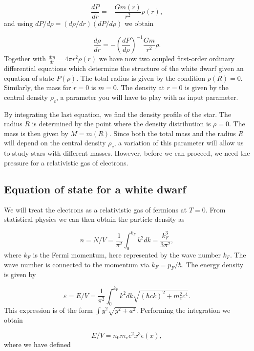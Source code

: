 \documentclass[%
oneside,                 %
final,                   %
10pt]{article}
\begin{document}
\begin{equation*}
\frac{dP}{dr}=-\frac{Gm(r)}{r^{2}}\rho (r),
\end{equation*}
and using $dP/d\rho = (d\rho/dr)(dP/d\rho)$ we obtain

\begin{equation*}
\frac{d\rho}{dr}=-\left(\frac{dP}{d\rho}\right)^{-1}\frac{Gm}{r^{2}}\rho.
\end{equation*}
Together with $\frac{dm}{dr}=4\pi r^{2}\rho (r)$
we have now two coupled first-order ordinary differential equations
which determine the structure of the white dwarf given an equation of state
$P(\rho )$.
The total radius is given by the condition 
$\rho (R)=0$. 
Similarly, the mass for $r=0$
is $m=0$.  
The density at $r=0$ is given by the central density $\rho_{c}$, a parameter you will have to play with 
as input parameter.

By integrating the last equation, we find the density profile of the star.
The radius $R$ is determined by the point where 
the density distribution
is $\rho =0$. 
The mass is then given by $M=m(R)$.
Since both the total mass and the radius $R$ will depend on the central density
$\rho_{c}$, a variation of this parameter will allow us to study stars 
with different masses.
However, before we can proceed, we need the pressure for a relativistic gas of electrons.

\subsection{Equation of state for a white dwarf}

We will treat the electrons as a relativistic gas of fermions at $T=0$.
From statistical physics we can then obtain the particle density as

\begin{equation*}
n=N/V=\frac{1}{\pi^{2}}\int_{0}^{k_{F}}k^{2}dk=\frac{k_{F}^{3}}{3\pi^{2}},
\end{equation*}
where $k_F$ is the Fermi momentum, here represented by the wave number $k_F$.
The wave number is connected to the momentum via $k_F=p_F/\hbar$.
The energy density is given by

\begin{equation*}
\varepsilon=E/V=\frac{1}{\pi^{2}}\int_{0}^{k_{F}}k^{2}dk
\sqrt{(\hbar ck)^{2}+m_{e}^{2}c^{4}}.
\end{equation*}
This expression is of the form $\int y^2\sqrt{y^2+a^2}$. Performing the integration we obtain

\begin{equation*}
E/V=n_0m_ec^2x^3\epsilon (x),
\end{equation*}
where we have defined
\end{document}
